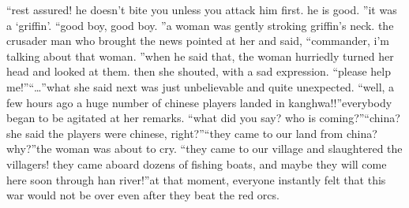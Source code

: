 “rest assured! he doesn’t bite you unless you attack him first.
 he is good.
”it was a ‘griffin’.
“good boy, good boy.
”a woman was gently stroking griffin’s neck.
 the crusader man who brought the news pointed at her and said, “commander, i’m talking about that woman.
”when he said that, the woman hurriedly turned her head and looked at them.
then she shouted, with a sad expression.
“please help me!”“…”what she said next was just unbelievable and quite unexpected.
“well, a few hours ago a huge number of chinese players landed in kanghwa!!”everybody began to be agitated at her remarks.
“what did you say? who is coming?”“china? she said the players were chinese, right?”“they came to our land from china? why?”the woman was about to cry.
“they came to our village and slaughtered the villagers! they came aboard dozens of fishing boats, and maybe they will come here soon through han river!”at that moment, everyone instantly felt that this war would not be over even after they beat the red orcs.


 